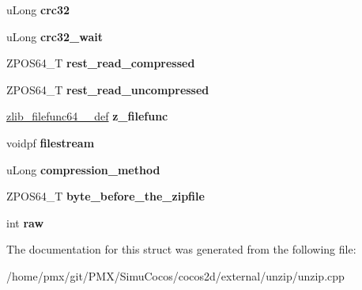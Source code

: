 \begin{DoxyCompactItemize}
\item 
\mbox{\label{structcocos2d_1_1file__in__zip64__read__info__s_ad5927c6c34fd8d6d3f80a641b536c339}} 
u\+Long {\bfseries crc32}
\item 
\mbox{\label{structcocos2d_1_1file__in__zip64__read__info__s_a8a2d0ddd4606ce1324f3ac77459b3bdb}} 
u\+Long {\bfseries crc32\+\_\+wait}
\item 
\mbox{\label{structcocos2d_1_1file__in__zip64__read__info__s_acc9d2d673aba2745137c27b50b7f3c76}} 
Z\+P\+O\+S64\+\_\+T {\bfseries rest\+\_\+read\+\_\+compressed}
\item 
\mbox{\label{structcocos2d_1_1file__in__zip64__read__info__s_a9fcba9c766ee55e292eeb3caf3ffbdcf}} 
Z\+P\+O\+S64\+\_\+T {\bfseries rest\+\_\+read\+\_\+uncompressed}
\item 
\mbox{\label{structcocos2d_1_1file__in__zip64__read__info__s_aa3e70c6b0f948ebfb9c14eca10df011a}} 
\hyperlink{structcocos2d_1_1zlib__filefunc64__32__def__s}{zlib\+\_\+filefunc64\+\_\+\_\+def} {\bfseries z\+\_\+filefunc}
\item 
\mbox{\label{structcocos2d_1_1file__in__zip64__read__info__s_a9e0823b523c56bfb9acb93812d0a156b}} 
voidpf {\bfseries filestream}
\item 
\mbox{\label{structcocos2d_1_1file__in__zip64__read__info__s_a8363f5d719d2aede71f25a4d7edd59f7}} 
u\+Long {\bfseries compression\+\_\+method}
\item 
\mbox{\label{structcocos2d_1_1file__in__zip64__read__info__s_a664addd5874203dac32cbad9b6483f33}} 
Z\+P\+O\+S64\+\_\+T {\bfseries byte\+\_\+before\+\_\+the\+\_\+zipfile}
\item 
\mbox{\label{structcocos2d_1_1file__in__zip64__read__info__s_ac832d9b5394dd7dd20fca13be644f091}} 
int {\bfseries raw}
\end{DoxyCompactItemize}


The documentation for this struct was generated from the following file\+:\begin{DoxyCompactItemize}
\item 
/home/pmx/git/\+P\+M\+X/\+Simu\+Cocos/cocos2d/external/unzip/unzip.\+cpp\end{DoxyCompactItemize}
